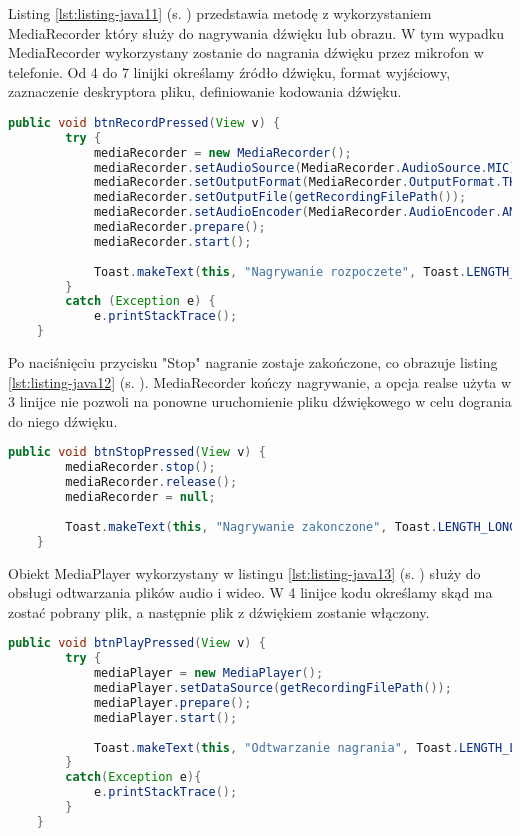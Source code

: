 Listing \ref{lst:listing-java11} (s. \pageref{lst:listing-java11}) przedstawia metodę z wykorzystaniem MediaRecorder który służy do nagrywania dźwięku lub obrazu. W tym wypadku MediaRecorder wykorzystany zostanie do nagrania dźwięku przez mikrofon w telefonie. Od 4 do 7 linijki określamy źródło dźwięku, format wyjściowy, zaznaczenie deskryptora pliku, definiowanie kodowania dźwięku.
\begin{lstlisting}[caption=Mikrofon - Włączenie nagrywania, label={lst:listing-java11}, language=Java]
	public void btnRecordPressed(View v) {
		try {
			mediaRecorder = new MediaRecorder();
			mediaRecorder.setAudioSource(MediaRecorder.AudioSource.MIC);
			mediaRecorder.setOutputFormat(MediaRecorder.OutputFormat.THREE_GPP);
			mediaRecorder.setOutputFile(getRecordingFilePath());
			mediaRecorder.setAudioEncoder(MediaRecorder.AudioEncoder.AMR_NB);
			mediaRecorder.prepare();
			mediaRecorder.start();
			
			Toast.makeText(this, "Nagrywanie rozpoczete", Toast.LENGTH_LONG).show();
		}
		catch (Exception e) {
			e.printStackTrace();
	}
\end{lstlisting}
	
\newpage
	
	
Po naciśnięciu przycisku "Stop" nagranie zostaje zakończone, co obrazuje listing \ref{lst:listing-java12} (s. \pageref{lst:listing-java12}). MediaRecorder kończy nagrywanie, a opcja realse użyta w 3 linijce nie pozwoli na ponowne uruchomienie pliku dźwiękowego w celu dogrania do niego dźwięku.
\begin{lstlisting}[caption=Mikrofon - Przerwanie nagrywania, label={lst:listing-java12}, language=Java]
	public void btnStopPressed(View v) {
		mediaRecorder.stop();
		mediaRecorder.release();
		mediaRecorder = null;
			
		Toast.makeText(this, "Nagrywanie zakonczone", Toast.LENGTH_LONG).show();
	}
\end{lstlisting}
	
Obiekt MediaPlayer wykorzystany w listingu \ref{lst:listing-java13} (s. \pageref{lst:listing-java13}) służy do obsługi odtwarzania plików audio i wideo. W 4 linijce kodu określamy skąd ma zostać pobrany plik, a następnie plik z dźwiękiem zostanie włączony.
\begin{lstlisting}[caption=Mikrofon - Odtworzenie nagrania, label={lst:listing-java13}, language=Java]
	public void btnPlayPressed(View v) {
		try {
			mediaPlayer = new MediaPlayer();
			mediaPlayer.setDataSource(getRecordingFilePath());
			mediaPlayer.prepare();
			mediaPlayer.start();
				
			Toast.makeText(this, "Odtwarzanie nagrania", Toast.LENGTH_LONG).show();
		}
		catch(Exception e){
			e.printStackTrace();
		}
	}
\end{lstlisting}




